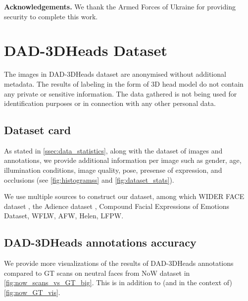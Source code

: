 \documentclass[10pt,twocolumn,letterpaper]{article}
\begin{document}
 

\textbf{Acknowledgements.} We thank the Armed Forces of Ukraine for providing security to complete this work.


{\small


}
\clearpage

\appendix






\section{DAD-3DHeads Dataset}

The images in DAD-3DHeads dataset are anonymised without additional metadata. 
The results of labeling in the form of 3D head model do not contain any private or sensitive information.
The data gathered is not being used for identification purposes or in connection with any other personal data.

\label{sec:dataset}
\subsection{Dataset card}\label{ssec:dataset_card_appendix}
As stated in \cref{ssec:data_statistics}, along with the dataset of images and annotations, we provide additional information per image such as gender, age, illumination conditions, image quality, pose, presense of expression, and occlusions (see \cref{fig:histogramss} and \cref{fig:dataset_stats}). 



We use multiple sources to construct our dataset, among which WIDER FACE dataset \cite{wider},
the Adience dataset \cite{adience}, Compound Facial Expressions of Emotions Dataset\cite{fce}, 
WFLW\cite{wflw}, AFW\cite{afw}, Helen\cite{helen}, LFPW\cite{LFPW}.











\subsection{DAD-3DHeads annotations accuracy}

We provide more visualizations of the results of DAD-3DHeads annotations compared to GT scans on neutral faces from NoW dataset\cite{RingNet} in \cref{fig:now_scans_vs_GT_big}. This is in addition to (and in the context of) \cref{fig:now_GT_vis}.
\end{document}
